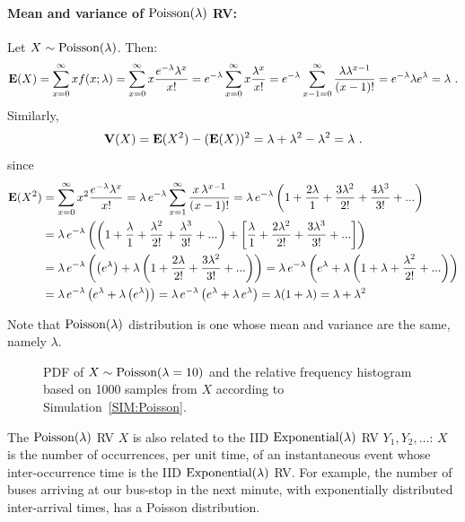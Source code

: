 \paragraph{Mean and variance of $\mbox{{\rm Poisson}}(\lambda)$ RV:}
Let $X \sim \mbox{{\rm Poisson}}(\lambda)$.  Then:
\[
\mathbf{E}(X) = \sum_{x=0}^{\infty} x f(x;\lambda)
= \sum_{x =0}^{\infty} x \frac{ e^{-\lambda} \lambda^x}{x!}
= e^{-\lambda} \sum_{x =0}^{\infty} x \frac{  \lambda^x}{x!}
= e^{-\lambda} \sum_{x -1 =0}^{\infty} \frac{ \lambda \lambda^{x-1}}{(x-1)!}
= e^{-\lambda} \lambda e^{\lambda}
= \lambda
\ .
\]
Similarly,
\[
\V(X) = \e(X^2)-(\e(X))^2 = \lambda + \lambda^2 - \lambda^2 = \lambda \ .
\]
since
\begin{align*}
\mathbf{E}(X^2)& = \sum_{x=0}^{\infty} x^2 \frac{e^{-\lambda} \lambda^x}{x!} = \lambda \, e^{-\lambda} \sum_{x=1}^{\infty} \frac{x \, \lambda^{x-1}}{(x-1)!}
= \lambda \, e^{-\lambda} \left( 1 + \frac{2 \lambda}{1} + \frac{3 \lambda^2}{2!} + \frac{4 \lambda^3}{3!} + ... \right)\\
&= \lambda \, e^{-\lambda} \left( \left( 1 + \frac{\lambda}{1} + \frac{\lambda^2}{2!} + \frac{\lambda^3}{3!} + ... \right) + \left[ \frac{\lambda}{1} + \frac{2 \lambda^2}{2!} + \frac{3 \lambda^3}{3!} + ... \right] \right)\\
&= \lambda \, e^{-\lambda} \left( \left( e^{\lambda} \right) + \lambda \left( 1 + \frac{2 \lambda}{2!} + \frac{3 \lambda^2}{3!} + ... \right) \right)
= \lambda \, e^{-\lambda} \left( e^{\lambda} + \lambda \left( 1 + \lambda + \frac{\lambda^2}{2!} + ... \right) \right)\\
&= \lambda \, e^{-\lambda} \left( e^{\lambda} + \lambda \left( e^{\lambda} \right) \right)
= \lambda \, e^{-\lambda} \left( e^{\lambda} + \lambda\, e^{\lambda}\right) = \lambda (1 + \lambda) = \lambda + \lambda^2
\end{align*}

Note that $\mbox{{\rm Poisson}}(\lambda)$ distribution is one whose mean and variance are the same, namely $\lambda$.

\begin{figure}[htpb]
\caption{PDF of $X \sim \mbox{{\rm Poisson}}(\lambda=10)$ and the relative frequency histogram based on 1000 samples from $X$ according to Simulation~\ref{SIM:Poisson}.\label{F:PlotPdfSim1000HistPoiss10}}
\centering   {}
\end{figure}

The $\mbox{{\rm Poisson}}(\lambda)$ RV $X$ is also related to the IID $\mbox{{\rm Exponential}}(\lambda)$ RV $Y_1,Y_2,\ldots$: $X$ is the number of occurrences, per unit time, of an instantaneous event whose inter-occurrence time is the IID $\mbox{{\rm Exponential}}(\lambda)$ RV.  For example, the number of buses arriving at our bus-stop in the next minute, with exponentially distributed inter-arrival times, has a Poisson distribution.

